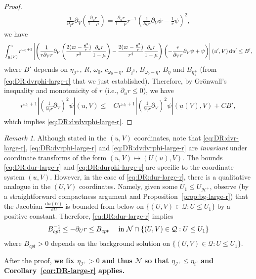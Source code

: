\documentclass[10pt, reqno]{amsart}
\theoremstyle{definition}
\theoremstyle{remark}
\newtheorem{remark}[theorem]{Remark}
\theoremstyle{conjecture}
\numberwithin{equation}{section}
\newcommand{\set}[1]{\{#1\}}
\newcommand{\ud}{\mathrm{d}}
\newcommand{\rd}{\partial}
\newcommand{\0}{\emptyset}
\newcommand{\omg}{\omega}
\newcommand{\bfe}{{\bf e}}
\newcommand{\calH}{\mathcal H}
\newcommand{\calI}{\mathcal I}
\newcommand{\calN}{\mathcal N}
\newcommand{\calQ}{\mathcal Q}
\newcommand{\PD}{\calQ}
\newcommand{\EH}{\calH^{+}}
\newcommand{\e}{\bfe}							%
\newcommand{\NI}{\calI^{+}}						%
\newcommand{\Abs}[1]{\left\vert #1 \right\vert}
\begin{document}
\begin{proof}
\begin{align*}
\frac{1}{\rd_{V} r} \rd_{V} \left( \frac{\rd_{u} r}{1-\mu} \right)
=  \frac{\rd_{u} r}{1-\mu} r^{-1} \left( \frac{1}{\rd_{V} r} \rd_{V} \psi - \frac{1}{r} \psi \right)^{2}, 
\end{align*}
we have
\begin{equation*}
	\int_{\underline{u}(V)}^{u} r^{\omg_{0}+1} \Abs{\left(\frac{1}{r \rd_{V} r} \rd_{V} \left( \frac{2 (\varpi - \frac{\e^{2}}{r}) } {r^{2}} \frac{\rd_{u} r}{1-\mu} \right) - \frac{2 (\varpi - \frac{\e^{2}}{r}) } {r^{4}} \frac{\rd_{u} r}{1-\mu} \right) \left(- \frac{r}{\rd_{V} r} \rd_{V} \psi +  \psi \right)}(u', V) \, \ud u' \leq B',
\end{equation*}
where $B'$ depends on $\eta_{\NI}$, $R$, $\omg_{0}$, $c_{\omg_{0} - \eta}$, $B_{i^{0}}$, $B_{\omg_{0} - \eta}$, $B_{\eta}$ and $B_{\eta_\NI}$ (from \eqref{eq:DR:dvrphi-large-r} that we just established). Therefore, by Gr\"onwall's inequality and monotonicity of $r$ (i.e., $\rd_{u} r \leq 0$), we have
\begin{align*}
	r^{\omg_{0}+1} \Abs{\left( \frac{1}{\rd_{V} r} \rd_{V} \right)^{2} \psi}(u, V)
	\leq & C r^{\omg_{0}+1} \Abs{\left( \frac{1}{\rd_{V} r} \rd_{V} \right)^{2} \psi}(\underline{u}(V), V) 
	+ C B' ,
\end{align*}
which implies \eqref{eq:DR:dvdvrphi-large-r}. \qedhere
\end{proof}

\begin{remark} \label{rem:DR-large-r:dUr}
Although stated in the $(u, V)$ coordinates, note that \eqref{eq:DR:dvr-large-r}, \eqref{eq:DR:dvrphi-large-r} and \eqref{eq:DR:dvdvrphi-large-r} are \emph{invariant} under coordinate transforms of the form $(u, V) \mapsto (U(u), V)$. 
The bounds \eqref{eq:DR:dur-large-r} and \eqref{eq:DR:durphi-large-r} are specific to the coordinate system $(u, V)$. However, in the case of \eqref{eq:DR:dur-large-r}, there is a qualitative analogue in the $(U, V)$ coordinates. Namely, given some $U_{1} \leq U_{\EH}$, observe (by a straightforward compactness argument and Proposition~\ref{prop:bg-large-r}) that the Jacobian $\frac{\ud u(U)}{\ud U}$ is bounded from below on $\set{(U, V) \in \PD : U \leq U_{1}}$ by a positive constant. Therefore, \eqref{eq:DR:dur-large-r} implies
\begin{equation} \label{eq:DR-large-r:dUr}
	B_{cpt}^{-1} \leq - \rd_{U} r \leq B_{cpt} \quad \hbox{ in } \calN \cap \set{(U, V) \in \PD : U \leq U_{1}}
\end{equation}
where $B_{cpt} > 0$ depends on the background solution on $\set{(U, V) \in \PD : U \leq U_{1}}$.
\end{remark} 
After the proof, {\bf we fix $\eta_{\NI} > 0$ and thus $\calN$ so that $\eta_{\NI} \leq \eta_{i^{0}}$ and Corollary~\ref{cor:DR-large-r} applies.}
\end{document}
